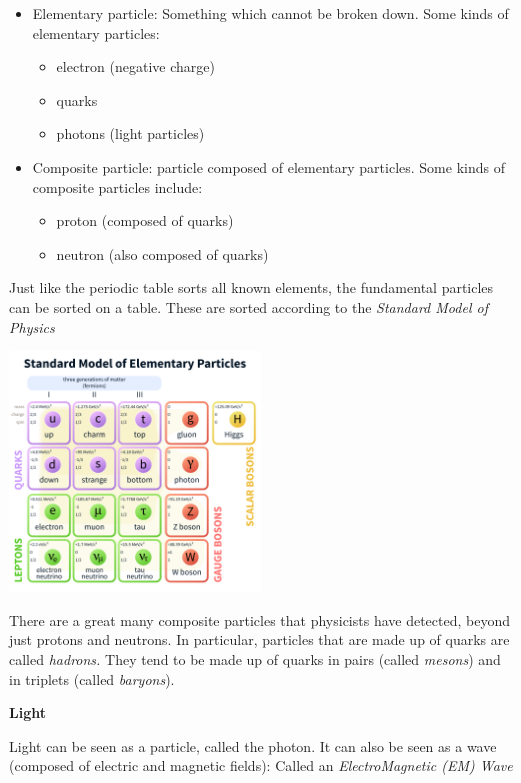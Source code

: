 \documentclass[12pt]{article}
\begin{document}
\begin{itemize}
	\item Elementary particle: Something which cannot be broken down. Some kinds of elementary particles:
	\begin{itemize}
		\item electron (negative charge)
		\item quarks
		\item photons (light particles)
	\end{itemize}
	\item Composite particle: particle composed of elementary particles. Some kinds of composite particles include:
	\begin{itemize}
		\item proton (composed of quarks)
		\item neutron (also composed of quarks)
	\end{itemize}
\end{itemize}

Just like the periodic table sorts all known elements, the fundamental particles can be sorted on a table. These are sorted according to the \textit{Standard Model of Physics}

\begin{center}
	\includegraphics[width=0.5\textwidth]{../images/standard_model.png}
\end{center}

There are a great many composite particles that physicists have detected, beyond just protons and neutrons. In particular, particles that are made up of quarks are called \textit{hadrons.} They tend to be made up of quarks in pairs (called \textit{mesons}) and in triplets (called \textit{baryons}).

\noindent\textbf{\large Light}

Light can be seen as a particle, called the photon. It can also be seen as a wave (composed of electric and magnetic fields): Called an \textit{ElectroMagnetic (EM) Wave}
\end{document}
